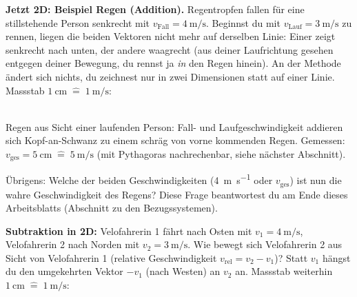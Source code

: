 \documentclass[addpoints,11pt,a4paper]{exam}
\begin{document}
\begin{theoriebox}
\textbf{Jetzt 2D: Beispiel Regen (Addition).} Regentropfen fallen für eine
stillstehende Person senkrecht mit $v_{\text{Fall}}=\SI{4}{\meter\per\second}$.
Beginnst du mit $v_{\text{Lauf}}=\SI{3}{\meter\per\second}$ zu rennen, liegen
die beiden Vektoren nicht mehr auf derselben Linie: Einer zeigt senkrecht
nach unten, der andere waagrecht (aus deiner Laufrichtung gesehen entgegen
deiner Bewegung, du rennst ja \emph{in} den Regen hinein). An der Methode
ändert sich nichts, du zeichnest nur in zwei Dimensionen statt auf einer
Linie. Massstab $\SI{1}{\centi\meter}\;\widehat{=}\;\SI{1}{\meter\per\second}$:

\begin{center}
\\[-0.1em]
{\scriptsize Regen aus Sicht einer laufenden Person: Fall- und
Laufgeschwindigkeit addieren sich Kopf-an-Schwanz zu einem schräg von vorne
kommenden Regen. Gemessen: $v_{\text{ges}}=\SI{5}{\centi\meter}\;\widehat{=}\;\SI{5}{\meter\per\second}$
(mit Pythagoras nachrechenbar, siehe nächster Abschnitt).}
\end{center}

Übrigens: Welche der beiden Geschwindigkeiten (\SI{4}{\meter\per\second}
oder $v_{\text{ges}}$) ist nun die \glqq wahre\grqq{} Geschwindigkeit des
Regens? Diese Frage beantwortest du am Ende dieses Arbeitsblatts (Abschnitt
zu den Bezugssystemen).

\textbf{Subtraktion in 2D:} Velofahrerin 1 fährt nach Osten mit
$v_1=\SI{4}{\meter\per\second}$, Velofahrerin 2 nach Norden mit
$v_2=\SI{3}{\meter\per\second}$. Wie bewegt sich Velofahrerin 2 aus Sicht
von Velofahrerin 1 (relative Geschwindigkeit $v_{\text{rel}}=v_2-v_1$)? Statt
$v_1$ hängst du den umgekehrten Vektor $-v_1$ (nach Westen) an $v_2$ an.
Massstab weiterhin $\SI{1}{\centi\meter}\;\widehat{=}\;\SI{1}{\meter\per\second}$:


\end{theoriebox}
\end{document}
